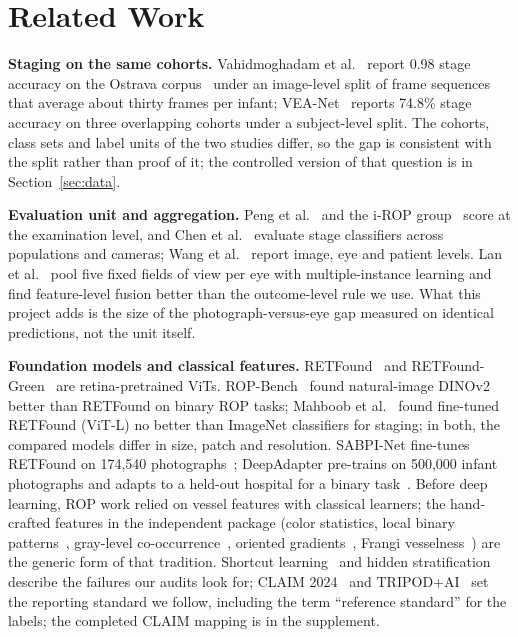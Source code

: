 \documentclass[journal]{IEEEtran}
\begin{document}
\section{Related Work}\label{sec:related}
\textbf{Staging on the same cohorts.} Vahidmoghadam et al.~\cite{vahid2026} report 0.98 stage accuracy on the Ostrava corpus~\cite{timkovic2024} under an image-level split of frame sequences that average about thirty frames per infant; VEA-Net~\cite{wang2026} reports 74.8\% stage accuracy on three overlapping cohorts under a subject-level split. The cohorts, class sets and label units of the two studies differ, so the gap is consistent with the split rather than proof of it; the controlled version of that question is in Section~\ref{sec:data}.

\textbf{Evaluation unit and aggregation.} Peng et al.~\cite{peng2021} and the i-ROP group~\cite{brown2018,derks2025} score at the examination level, and Chen et al.~\cite{chen2021} evaluate stage classifiers across populations and cameras; Wang et al.~\cite{wang2021} report image, eye and patient levels. Lan et al.~\cite{lan2026} pool five fixed fields of view per eye with multiple-instance learning and find feature-level fusion better than the outcome-level rule we use. What this project adds is the size of the photograph-versus-eye gap measured on identical predictions, not the unit itself.

\textbf{Foundation models and classical features.} RETFound~\cite{zhou2023} and RETFound-Green~\cite{engelmann2025} are retina-pretrained ViTs. ROP-Bench~\cite{luo2026} found natural-image DINOv2~\cite{oquab2024} better than RETFound on binary ROP tasks; Mahboob et al.~\cite{mahboob2025} found fine-tuned RETFound (ViT-L) no better than ImageNet classifiers for staging; in both, the compared models differ in size, patch and resolution. SABPI-Net fine-tunes RETFound on 174{,}540 photographs~\cite{chen2025}; DeepAdapter pre-trains on 500{,}000 infant photographs and adapts to a held-out hospital for a binary task~\cite{zhao2026}. Before deep learning, ROP work relied on vessel features with classical learners; the hand-crafted features in the independent package (color statistics, local binary patterns~\cite{ojala2002}, gray-level co-occurrence~\cite{haralick1973}, oriented gradients~\cite{dalal2005}, Frangi vesselness~\cite{frangi1998}) are the generic form of that tradition. Shortcut learning~\cite{geirhos2020,degrave2021} and hidden stratification~\cite{oakden2020} describe the failures our audits look for; CLAIM 2024~\cite{tejani2024} and TRIPOD+AI~\cite{collins2024} set the reporting standard we follow, including the term ``reference standard'' for the labels; the completed CLAIM mapping is in the supplement.
\end{document}
